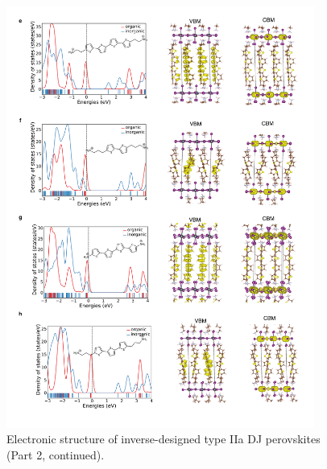\begin{figure}[htbp]
    \ContinuedFloat
    \centering
    \includegraphics[width=0.9\textwidth]{figures/synthesis-feasibility/figure5-23-2.png}
    \caption{Electronic structure of inverse-designed type IIa DJ perovskites (Part 2, continued).}
\end{figure}

